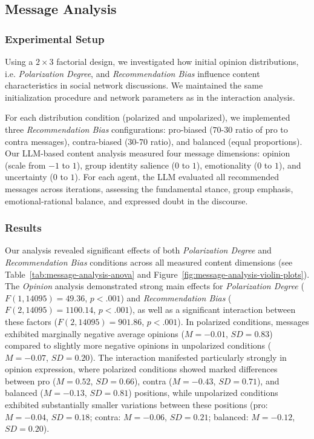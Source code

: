 \subsection{Message Analysis}

\subsubsection{Experimental Setup}

Using a $2\times3$ factorial design, we investigated how initial opinion distributions, i.e. \emph{Polarization Degree}, and \emph{Recommendation Bias} influence content characteristics in social network discussions. We maintained the same initialization procedure and network parameters as in the interaction analysis.

For each distribution condition (polarized and unpolarized), we implemented three \emph{Recommendation Bias} configurations: pro-biased ($70$-$30$ ratio of pro to contra messages), contra-biased ($30$-$70$ ratio), and balanced (equal proportions).
Our LLM-based content analysis measured four message dimensions: opinion (scale from $-1$ to $1$), group identity salience ($0$ to $1$), emotionality ($0$ to $1$), and uncertainty ($0$ to $1$). For each agent, the LLM evaluated all recommended messages across iterations, assessing the fundamental stance, group emphasis, emotional-rational balance, and expressed doubt in the discourse.

\subsubsection{Results}

Our analysis revealed significant effects of both \emph{Polarization Degree} and \emph{Recommendation Bias} conditions across all measured content dimensions (see Table~\ref{tab:message-analysis-anova} and Figure~\ref{fig:message-analysis-violin-plots}). The \emph{Opinion} analysis demonstrated strong main effects for \emph{Polarization Degree} ($F(1, 14095) = 49.36$, $p < .001$) and \emph{Recommendation Bias} ($F(2, 14095) = 1100.14$, $p < .001$), as well as a significant interaction between these factors ($F(2, 14095) = 901.86$, $p < .001$). In polarized conditions, messages exhibited marginally negative average opinions ($M = -0.01$, $SD = 0.83$) compared to slightly more negative opinions in unpolarized conditions ($M = -0.07$, $SD = 0.20$). The interaction manifested particularly strongly in opinion expression, where polarized conditions showed marked differences between pro ($M = 0.52$, $SD = 0.66$), contra ($M = -0.43$, $SD = 0.71$), and balanced ($M = -0.13$, $SD = 0.81$) positions, while unpolarized conditions exhibited substantially smaller variations between these positions (pro: $M = -0.04$, $SD = 0.18$; contra: $M = -0.06$, $SD = 0.21$; balanced: $M = -0.12$, $SD = 0.20$).

